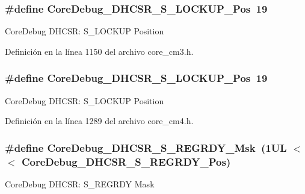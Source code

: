 \subsubsection[{\texorpdfstring{Core\+Debug\+\_\+\+D\+H\+C\+S\+R\+\_\+\+S\+\_\+\+L\+O\+C\+K\+U\+P\+\_\+\+Pos}{CoreDebug_DHCSR_S_LOCKUP_Pos}}]{\setlength{\rightskip}{0pt plus 5cm}\#define Core\+Debug\+\_\+\+D\+H\+C\+S\+R\+\_\+\+S\+\_\+\+L\+O\+C\+K\+U\+P\+\_\+\+Pos~19}\hypertarget{group___c_m_s_i_s___core_debug_ga2900dd56a988a4ed27ad664d5642807e}{}\label{group___c_m_s_i_s___core_debug_ga2900dd56a988a4ed27ad664d5642807e}
Core\+Debug D\+H\+C\+SR\+: S\+\_\+\+L\+O\+C\+K\+UP Position 

Definición en la línea 1150 del archivo core\+\_\+cm3.\+h.

\subsubsection[{\texorpdfstring{Core\+Debug\+\_\+\+D\+H\+C\+S\+R\+\_\+\+S\+\_\+\+L\+O\+C\+K\+U\+P\+\_\+\+Pos}{CoreDebug_DHCSR_S_LOCKUP_Pos}}]{\setlength{\rightskip}{0pt plus 5cm}\#define Core\+Debug\+\_\+\+D\+H\+C\+S\+R\+\_\+\+S\+\_\+\+L\+O\+C\+K\+U\+P\+\_\+\+Pos~19}\hypertarget{group___c_m_s_i_s___core_debug_ga2900dd56a988a4ed27ad664d5642807e}{}\label{group___c_m_s_i_s___core_debug_ga2900dd56a988a4ed27ad664d5642807e}
Core\+Debug D\+H\+C\+SR\+: S\+\_\+\+L\+O\+C\+K\+UP Position 

Definición en la línea 1289 del archivo core\+\_\+cm4.\+h.

\subsubsection[{\texorpdfstring{Core\+Debug\+\_\+\+D\+H\+C\+S\+R\+\_\+\+S\+\_\+\+R\+E\+G\+R\+D\+Y\+\_\+\+Msk}{CoreDebug_DHCSR_S_REGRDY_Msk}}]{\setlength{\rightskip}{0pt plus 5cm}\#define Core\+Debug\+\_\+\+D\+H\+C\+S\+R\+\_\+\+S\+\_\+\+R\+E\+G\+R\+D\+Y\+\_\+\+Msk~(1\+U\+L $<$$<$ Core\+Debug\+\_\+\+D\+H\+C\+S\+R\+\_\+\+S\+\_\+\+R\+E\+G\+R\+D\+Y\+\_\+\+Pos)}\hypertarget{group___c_m_s_i_s___core_debug_gac4cd6f3178de48f473d8903e8c847c07}{}\label{group___c_m_s_i_s___core_debug_gac4cd6f3178de48f473d8903e8c847c07}
Core\+Debug D\+H\+C\+SR\+: S\+\_\+\+R\+E\+G\+R\+DY Mask 

